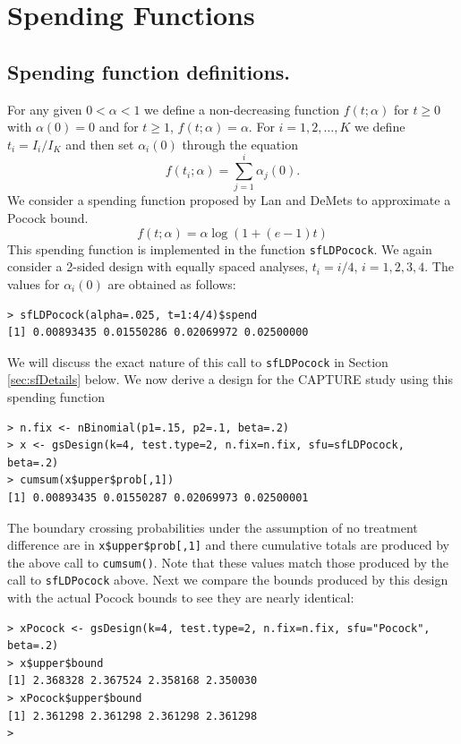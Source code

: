 \section{Spending Functions \label{sec:spendfn}}

\subsection{Spending function definitions.} For any given $0<\alpha<1$ we define a non-decreasing function $f(t; \alpha)$ for $t\geq 0$ with $\alpha\left(  0\right)  =0$ and for $t\geq 1$, 
$f( t; \alpha)  =\alpha$. 
For $i=1,2,\ldots,K$ we define $t_i=I_{i}/I_{K}$ and then set $\alpha_i(0)$ through the equation
\begin{equation}
f(t_i;\alpha)=\sum_{j=1}^{i}\alpha_{j}(0).\label{alpha spending}%
\end{equation}
We consider a spending function proposed by Lan and DeMets \cite{LanDeMets} to approximate a Pocock bound. 
\begin{equation}
f(t; \alpha)=\alpha\log(1+(e-1)t)\label{eq:sfLDPocock}
\end{equation}
This spending function is implemented in the function \texttt{sfLDPocock}.
We again consider a 2-sided design with equally spaced analyses, $t_i=i/4$, $i=1,2,3,4$.
The values for $\alpha_i(0)$ are obtained as follows:
\begin{verbatim}
> sfLDPocock(alpha=.025, t=1:4/4)$spend
[1] 0.00893435 0.01550286 0.02069972 0.02500000
\end{verbatim}
We will discuss the exact nature of this call to \texttt{sfLDPocock} in Section \ref{sec:sfDetails} below.
We now derive a design for the CAPTURE study using this spending function
\begin{verbatim}
> n.fix <- nBinomial(p1=.15, p2=.1, beta=.2)
> x <- gsDesign(k=4, test.type=2, n.fix=n.fix, sfu=sfLDPocock, beta=.2)
> cumsum(x$upper$prob[,1])
[1] 0.00893435 0.01550287 0.02069973 0.02500001
\end{verbatim}
The boundary crossing probabilities under the assumption of no treatment difference are in \texttt{x\$upper\$prob[,1]} and there cumulative totals are produced by the above call to \texttt{cumsum()}. 
Note that these values match those produced by the call to \texttt{sfLDPocock} above.
Next we compare the bounds produced by this design with the actual Pocock bounds to see they are nearly identical:
\bigskip
\begin{verbatim}
> xPocock <- gsDesign(k=4, test.type=2, n.fix=n.fix, sfu="Pocock", beta=.2)
> x$upper$bound
[1] 2.368328 2.367524 2.358168 2.350030
> xPocock$upper$bound
[1] 2.361298 2.361298 2.361298 2.361298
>
\end{verbatim}
\bigskip

